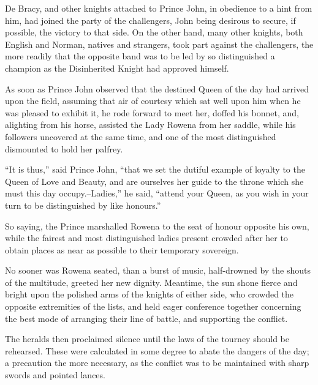De Bracy, and other knights attached to Prince John, in obedience to a
hint from him, had joined the party of the challengers, John being
desirous to secure, if possible, the victory to that side. On the other
hand, many other knights, both English and Norman, natives and
strangers, took part against the challengers, the more readily that the
opposite band was to be led by so distinguished a champion as the
Disinherited Knight had approved himself.

As soon as Prince John observed that the destined Queen of the day had
arrived upon the field, assuming that air of courtesy which sat well
upon him when he was pleased to exhibit it, he rode forward to meet her,
doffed his bonnet, and, alighting from his horse, assisted the Lady
Rowena from her saddle, while his followers uncovered at the same time,
and one of the most distinguished dismounted to hold her palfrey.

``It is thus,'' said Prince John, ``that we set the dutiful example of
loyalty to the Queen of Love and Beauty, and are ourselves her guide to
the throne which she must this day occupy.--Ladies,'' he said, ``attend
your Queen, as you wish in your turn to be distinguished by like
honours.''

So saying, the Prince marshalled Rowena to the seat of honour opposite
his own, while the fairest and most distinguished ladies present crowded
after her to obtain places as near as possible to their temporary
sovereign.

No sooner was Rowena seated, than a burst of music, half-drowned by the
shouts of the multitude, greeted her new dignity. Meantime, the sun
shone fierce and bright upon the polished arms of the knights of either
side, who crowded the opposite extremities of the lists, and held eager
conference together concerning the best mode of arranging their line of
battle, and supporting the conflict.

The heralds then proclaimed silence until the laws of the tourney should
be rehearsed. These were calculated in some degree to abate the dangers
of the day; a precaution the more necessary, as the conflict was to be
maintained with sharp swords and pointed lances.

